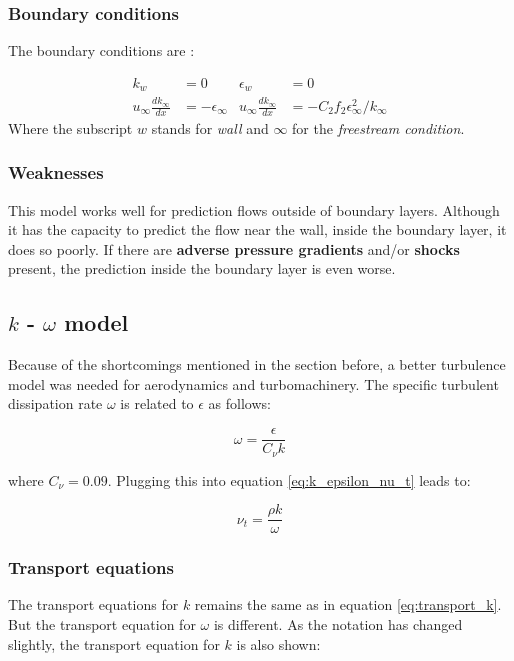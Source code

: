 \subsubsection{Boundary conditions}
The boundary conditions are \cite{JONES1972301}:

\begin{align*}
    k_{w}        &= 0       &\epsilon_{w} &= 0 \\
    u_{\infty} \frac{d k_{\infty}}{d x}  &= - \epsilon_{\infty}
    & u_{\infty} \frac{d k_{\infty}}{d x} &= 
    - C_2 f_2 \epsilon_{\infty}^2 / k_{\infty}
\end{align*}
\noindent Where the subscript $w$ stands for \textit{wall} and $\infty$ for the
\textit{freestream condition}.


\subsubsection{Weaknesses}
This model works well for prediction flows outside of boundary layers. Although
it has the capacity to predict the flow near the wall, inside the boundary
layer, it does so poorly. If there are \textbf{adverse pressure gradients}
and/or \textbf{shocks} present, the prediction inside the boundary layer is
even worse. \cite{cfd101_k-epsilon}




\subsection{$k$ - $\omega$ model}
Because of the shortcomings mentioned in the section before, a better
turbulence model was needed for aerodynamics and turbomachinery. The specific
turbulent dissipation rate $\omega$ is related to $\epsilon$ as follows:

\begin{equation}
    \label{eq:omega_epsilon}
    \omega = \frac{\epsilon}{C_{\nu} k}
\end{equation}

\noindent where $C_{\nu} = 0.09$. Plugging this into equation
\ref{eq:k_epsilon_nu_t} leads to:

\begin{equation}
    \nu_t = \frac{\rho k}{\omega}
\end{equation}


\subsubsection{Transport equations}
The transport equations for $k$ remains the same as in equation
\ref{eq:transport_k}. But the transport equation for $\omega$ is different. As
the notation has changed slightly, the transport equation for $k$ is also
shown:

